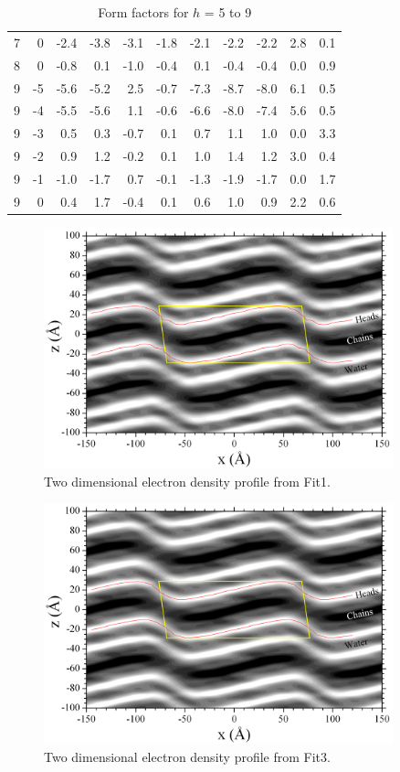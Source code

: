 \begin{table}[htbp]
\begin{tabular}{rrrrrrrrrrr}
7 & 0 & -2.4 & -3.8 & -3.1 & -1.8 & -2.1 & -2.2 & -2.2 & 2.8 & 0.1 \\ 
8 & 0 & -0.8 & 0.1 & -1.0 & -0.4 & 0.1 & -0.4 & -0.4 & 0.0 & 0.9 \\ 
9 & -5 & -5.6 & -5.2 & 2.5 & -0.7 & -7.3 & -8.7 & -8.0 & 6.1 & 0.5 \\ 
9 & -4 & -5.5 & -5.6 & 1.1 & -0.6 & -6.6 & -8.0 & -7.4 & 5.6 & 0.5 \\ 
9 & -3 & 0.5 & 0.3 & -0.7 & 0.1 & 0.7 & 1.1 & 1.0 & 0.0 & 3.3 \\ 
9 & -2 & 0.9 & 1.2 & -0.2 & 0.1 & 1.0 & 1.4 & 1.2 & 3.0 & 0.4 \\ 
9 & -1 & -1.0 & -1.7 & 0.7 & -0.1 & -1.3 & -1.9 & -1.7 & 0.0 & 1.7 \\ 
9 & 0 & 0.4 & 1.7 & -0.4 & 0.1 & 0.6 & 1.0 & 0.9 & 2.2 & 0.6 \\ 
\hline
\end{tabular}
\caption{Form factors for $h$ = 5 to 9}
\label{tb:LAXS_fits2}
\end{table}

\begin{figure}
  \centering
  \includegraphics[width=0.9\textwidth]{figures/ripple/LAXS/Fit1_2D_edp}
  \caption[]{Two dimensional electron density profile from Fit1.}
  \label{fig:Fit1_2D_edp}
\end{figure}

\begin{figure}
  \centering
  \includegraphics[width=0.9\textwidth]{figures/ripple/LAXS/Fit3_2D_edp}
  \caption[]{Two dimensional electron density profile from Fit3.}
  \label{fig:Fit3_2D_edp}
\end{figure}

